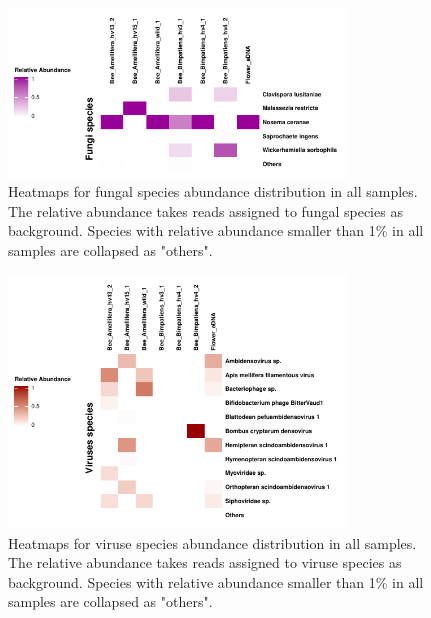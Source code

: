 \documentclass[11pt]{article}
\begin{document}
  \begin{figure}[H]
    \centering
    \includegraphics[width=0.8\textwidth]{../Figures/RelativeAbundance_0_01_species_Fungi.pdf}
    \caption{Heatmaps for fungal species abundance distribution in all samples. 
    The relative abundance takes reads assigned to fungal species as background. 
    Species with relative abundance smaller than 1\% in all samples are collapsed as "others".}
    \label{FungusHeatmap}
    \end{figure}

  \begin{figure}[H]
    \centering
    \includegraphics[width=0.8\textwidth]{../Figures/RelativeAbundance_0_01_species_Viruses.pdf}
    \caption{Heatmaps for viruse species abundance distribution in all samples. 
    The relative abundance takes reads assigned to viruse species as background. 
    Species with relative abundance smaller than 1\% in all samples are collapsed as "others".}
    \label{ViruseHeatmap}
    \end{figure}
  
\end{document}

